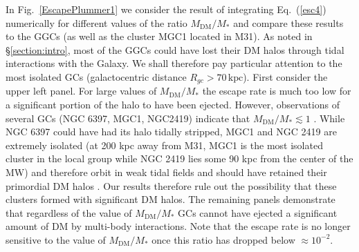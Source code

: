 \documentclass[aps,floatfix,prd,showpacs]{revtex4}
\newcommand{\MDM}{M_{\mathrm{DM}}}
\newcommand{\kpc}{\textrm{kpc}}
\begin{document}
In Fig.~\ref{EscapePlummer1} we consider the result of integrating Eq.~(\ref{esc4}) numerically for different values of the ratio $\MDM/M_*$ and compare these results to the GGCs (as well as the cluster MGC1 located in M31).  As noted in \S\ref{section:intro}, most of the GGCs could have lost their DM halos through tidal interactions with the Galaxy.  We shall therefore pay particular attention to the most isolated GCs (galactocentric distance $R_{gc} > 70\, \kpc$).  First consider the upper left panel.  For large values of $\MDM/M_*$ the escape rate is much too low for a significant portion of the halo to have been ejected.  However, observations of several GCs (NGC 6397, MGC1, NGC2419) indicate that $\MDM/M_* \lesssim 1$ \cite{Shin,Conroy}.  While NGC 6397 could have had its halo tidally stripped, MGC1 and NGC 2419 are extremely isolated (at 200 kpc away from M31, MGC1 is the most isolated cluster in the local group while NGC 2419 lies some 90 kpc from the center of the MW) and therefore orbit in weak tidal fields and should have retained their primordial DM halos \cite{Conroy}.  Our results therefore rule out the possibility that these clusters formed with significant DM halos.  The remaining panels demonstrate that regardless of the value of $\MDM/M_*$ GCs cannot have ejected a significant amount of DM by multi-body interactions.  Note that the escape rate is no longer sensitive to the value of $\MDM/M_*$ once this ratio has dropped below $\approx 10^{-2}$.
%
\end{document}
